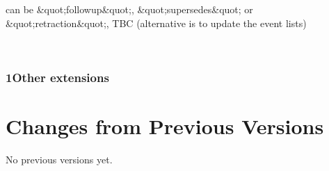 \documentclass[11pt,a4paper]{ivoa}
\begin{document}
can be \&quot;followup\&quot;, \&quot;supersedes\&quot; or \&quot;retraction\&quot;, TBC (alternative is to update the event lists) 

\\

\subsubsection{1Other extensions\\}



\appendix
\section{Changes from Previous Versions}

No previous versions yet.  



\end{document}
